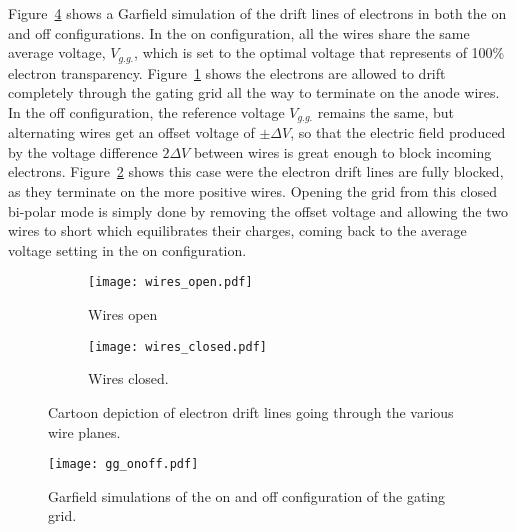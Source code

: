 Figure~\ref{fig:gg_onoff} shows a Garfield simulation of the drift lines of electrons in both the on and off configurations. In the on configuration, all the wires share the same average voltage, $V_{g.g.}$, which is set to the optimal voltage that represents of 100\% electron transparency. Figure~\ref{fig:wires_open} shows the electrons are allowed to drift completely through the gating grid all the way to terminate on the anode wires. In the off configuration, the reference voltage $V_{g.g.}$ remains the same, but alternating wires get an offset voltage of $\pm \Delta V$, so that the electric field produced by the voltage difference $2\Delta V$ between wires is great enough to block incoming electrons. Figure~\ref{fig:wires_closed} shows this case were the electron drift lines are fully blocked, as they terminate on the more positive wires. Opening the grid from this closed bi-polar mode is simply done by removing the offset voltage and allowing the two wires to short which equilibrates their charges, coming back to the average voltage setting in the on configuration.

\begin{figure}[!htb]
    \centering
    \begin{subfigure}[t]{0.49\textwidth}
        \centering
        \texttt{[image: wires\_open.pdf]} 
        \caption{Wires open} \label{fig:wires_open}
    \end{subfigure}
    \hfill
    \begin{subfigure}[t]{0.42\textwidth}
        \centering
        \texttt{[image: wires\_closed.pdf]} 
        \caption{Wires closed.} \label{fig:wires_closed}
    \end{subfigure}
\caption{Cartoon depiction of electron drift lines going through the various wire planes.}
\label{fig:wires}
\end{figure}



\begin{figure}[!htb]
\centering
\texttt{[image: gg\_onoff.pdf]}
\caption{Garfield simulations of the on and off configuration of the gating grid.}
\label{fig:gg_onoff}
\end{figure}


